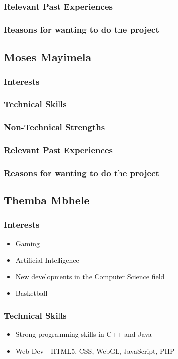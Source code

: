 \documentclass[a4paper,12pt]{article}
\begin{document}
\subsubsection{Relevant Past Experiences}
\subsubsection{Reasons for wanting to do the project}
\subsection{Moses Mayimela}
\subsubsection{Interests}
\subsubsection{Technical Skills}
\subsubsection{Non-Technical Strengths}
\subsubsection{Relevant Past Experiences}
\subsubsection{Reasons for wanting to do the project}
\subsection{Themba Mbhele}
\subsubsection{Interests}
\begin{itemize}
    \item Gaming
    \item Artificial Intelligence
    \item New developments in the Computer Science field
    \item Basketball
\end{itemize}
\subsubsection{Technical Skills}
\begin{itemize}
    \item Strong programming skills in C++ and Java
    \item Web Dev - HTML5, CSS, WebGL, JavaScript, PHP
\end{itemize}
\end{document}
